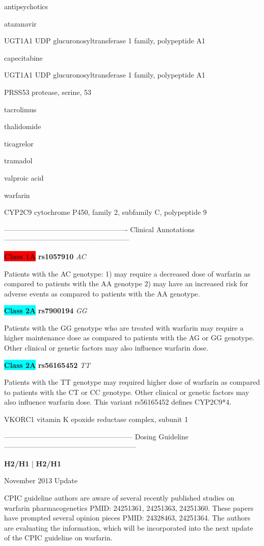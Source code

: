 \documentclass{resume} %
\begin{document}
\begin{rSection}{ antipsychotics }
\begin{rSection}{ atazanavir }
\begin{rSubsection}{ UGT1A1 }{ UDP glucuronosyltransferase 1 family, polypeptide A1 }{}{}
\begin{rSection}{ capecitabine }
\begin{rSubsection}{ UGT1A1 }{ UDP glucuronosyltransferase 1 family, polypeptide A1 }{}{}
\begin{rSubsection}{ PRSS53 }{ protease, serine, 53 }{}{}
\begin{rSection}{ tacrolimus }
\begin{rSection}{ thalidomide }
\begin{rSection}{ ticagrelor }
\begin{rSection}{ tramadol }
\begin{rSection}{ valproic acid }
\begin{rSection}{ warfarin }
\begin{rSubsection}{ CYP2C9 }{ cytochrome P450, family 2, subfamily C, polypeptide 9 }{}{}
\item[] ---------------------------------------------------- Clinical Annotations -----------------------------------------------------\newline
\item \textbf{\colorbox{red} {Class 1A}} \textbf{ rs1057910 } \textit{ AC }
\item[] Patients with the AC genotype: 1) may require a decreased dose of warfarin as compared to patients with the AA genotype 2) may have an increased risk for adverse events as compared to patients with the AA genotype.\item \textbf{\colorbox{cyan} {Class 2A}} \textbf{ rs7900194 } \textit{ GG }
\item[] Patients with the GG genotype who are treated with warfarin may require a higher maintenance dose as compared to patients with the AG or GG genotype.  Other clinical or genetic factors may also influence warfarin dose.\item \textbf{\colorbox{cyan} {Class 2A}} \textbf{ rs56165452 } \textit{ TT }
\item[] Patients with the TT genotype may required higher dose of warfarin as compared to patients with the CT or CC genotype. Other clinical or genetic factors may also influence  warfarin dose. This variant rs56165452 defines CYP2C9*4.
\end{rSubsection}
\end{rSection}\begin{rSubsection}{ VKORC1 }{ vitamin K epoxide reductase complex, subunit 1 }{}{}
\item[]
\item[] ------------------------------------------------------ Dosing Guideline --------------------------------------------------------\newline
\item[]
\item[] \textbf{ H2/H1 } | \textbf{ H2/H1 }
\item November 2013 Update
 \newline
\item CPIC guideline authors are aware of several recently published studies on warfarin pharmacogenetics PMID: 24251361, 24251363, 24251360. These papers have prompted several opinion pieces PMID: 24328463, 24251364. The authors are evaluating the information, which will be incorporated into the next update of the CPIC guideline on warfarin.
 \newline

\end{rSubsection}
\end{rSection}
\end{rSection}
\end{rSection}
\end{rSection}
\end{rSection}
\end{rSubsection}
\end{rSubsection}
\end{rSection}
\end{rSubsection}
\end{rSection}
\end{rSection}
\end{document}
